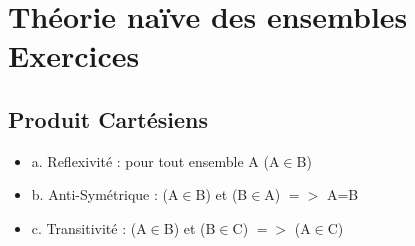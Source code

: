 \newpage

\section{Théorie naïve des ensembles Exercices}
\vspace{5mm} %

\subsection{Produit Cartésiens}
\vspace{3mm} %

\begin{itemize}
\item {a. Reflexivité : pour tout ensemble A (A$\in$B)}
\item {b. Anti-Symétrique : (A$\in$B) et (B$\in$A) $=>$ A=B}
\item {c. Transitivité : (A$\in$B) et (B$\in$C) $=>$ (A$\in$C)}
\end{itemize}
